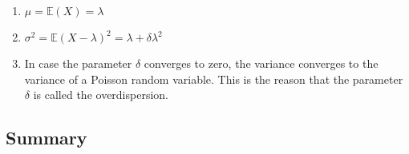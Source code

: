 \begin{enumerate}
    \item $\mu = \mathbb{E}(X) = \lambda$
    \hfill \cite{statistics/book/Statistics-for-Data-Scientists/Maurits-Kaptein}

    \item $\sigma^2 = \mathbb{E}(X - \lambda)^2 = \lambda + \delta\lambda^2$
    \hfill \cite{statistics/book/Statistics-for-Data-Scientists/Maurits-Kaptein}

    \item In case the parameter $\delta$ converges to zero, the variance converges to the variance of a Poisson random variable. 
    This is the reason that the parameter $\delta$ is called the overdispersion.
\end{enumerate}




\subsection{Summary}

